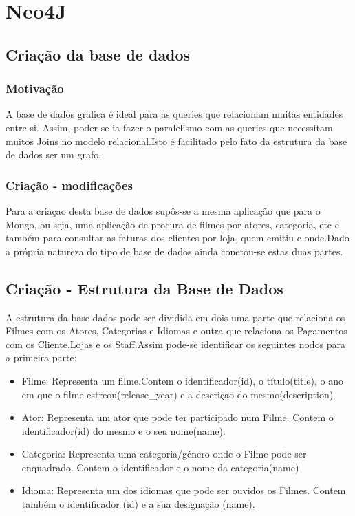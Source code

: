 \section{Neo4J}

\subsection{Criação da base de dados}

\subsubsection{Motivação}

A base de dados grafica é ideal para as queries que relacionam muitas entidades entre si. Assim, poder-se-ia fazer o paralelismo com as queries que necessitam muitos Joins no modelo relacional.Isto é facilitado pelo fato da estrutura da base de dados ser um grafo.

\subsubsection{Criação - modificações}

Para a criaçao desta base de dados supôs-se a mesma aplicação que para o Mongo, ou seja, uma aplicação de procura de filmes por atores, categoria, etc e também para consultar as faturas dos clientes por loja, quem emitiu e onde.Dado a própria natureza do tipo de base de dados ainda conetou-se estas duas partes.

\subsection{Criação - Estrutura da Base de Dados}

A estrutura da base dados pode ser dividida em dois uma parte que relaciona os Filmes com os Atores, Categorias e Idiomas e outra que relaciona os Pagamentos com os Cliente,Lojas e os Staff.Assim pode-se identificar os seguintes nodos para a primeira parte:
\begin{itemize}

\item Filme: Representa um filme.Contem o identificador(id), o título(title), o ano em que o filme estreou(release\_year) e a descriçao do mesmo(description)
\hfill\\
\item Ator: Representa um ator que pode ter participado num Filme. Contem o identificador(id) do mesmo e o seu nome(name).
\hfill\\
\item Categoria: Representa uma categoria/género onde o Filme pode ser enquadrado. Contem o identificador e o nome da categoria(name)
\hfill\\
\item Idioma: Representa um dos idiomas que pode ser ouvidos os Filmes. Contem também o identificador (id) e a sua designação (name). 

\end{itemize}

